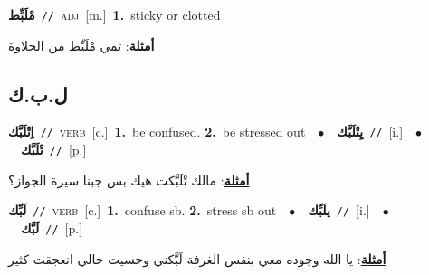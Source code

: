 \documentclass[10pt,a4paper,twoside]{article} %
\begin{document}
\begin{multicols}{2}
{{{{{{{{{{{{\setlength\topsep{0pt}\textbf{\foreignlanguage{arabic}{مْلَبِّط}}\ {\color{gray}\texttt{//}\color{black}}\ \textsc{adj}\ [m.]\ \textbf{1.}~sticky or clotted\  \begin{flushright}\color{gray}\foreignlanguage{arabic}{\textbf{\underline{\foreignlanguage{arabic}{أمثلة}}}: ثمي مْلَبِّط من الحلاوة}\end{flushright}\color{black}} \vspace{2mm}

\vspace{-3mm}
\subsection*{\color{blue}\foreignlanguage{arabic}{ل.ب.ك}\color{blue}{}} 

{\setlength\topsep{0pt}\textbf{\foreignlanguage{arabic}{اِتْلَبَّك}}\ {\color{gray}\texttt{//}\color{black}}\ \textsc{verb}\ [c.]\ \textbf{1.}~be confused.  \textbf{2.}~be stressed out\ \ $\bullet$\ \ \setlength\topsep{0pt}\textbf{\foreignlanguage{arabic}{يِتْلَبَّك}}\ {\color{gray}\texttt{//}\color{black}}\ [i.]\ \ $\bullet$\ \ \setlength\topsep{0pt}\textbf{\foreignlanguage{arabic}{تْلَبَّك}}\ {\color{gray}\texttt{//}\color{black}}\ [p.]\  \begin{flushright}\color{gray}\foreignlanguage{arabic}{\textbf{\underline{\foreignlanguage{arabic}{أمثلة}}}: مالك تْلَبَّكت هيك بس جبنا سيرة الجواز؟}\end{flushright}\color{black}} \vspace{2mm}

{\setlength\topsep{0pt}\textbf{\foreignlanguage{arabic}{لَبِّك}}\ {\color{gray}\texttt{//}\color{black}}\ \textsc{verb}\ [c.]\ \textbf{1.}~confuse sb.  \textbf{2.}~stress sb out\ \ $\bullet$\ \ \setlength\topsep{0pt}\textbf{\foreignlanguage{arabic}{يلَبِّك}}\ {\color{gray}\texttt{//}\color{black}}\ [i.]\ \ $\bullet$\ \ \setlength\topsep{0pt}\textbf{\foreignlanguage{arabic}{لَبَّك}}\ {\color{gray}\texttt{//}\color{black}}\ [p.]\  \begin{flushright}\color{gray}\foreignlanguage{arabic}{\textbf{\underline{\foreignlanguage{arabic}{أمثلة}}}: يا الله وجوده معي بنفس الغرفة لَبَّكني وحسيت حالي انعجقت كثير}\end{flushright}\color{black}} \vspace{2mm}

}}}}}}}}}}}
\end{multicols}
\end{document}
